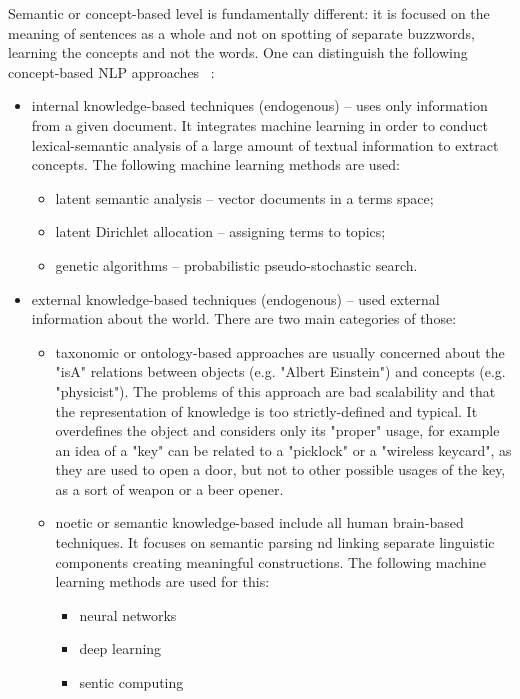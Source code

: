 \documentclass[11pt]{report}
\numberwithin{equation}{section} %
\begin{document}
Semantic or concept-based level is fundamentally different: it is focused on the meaning of sentences as a whole and not on spotting of separate buzzwords, learning the concepts and not the words. One can distinguish the following concept-based NLP approaches ~\cite{Cambria}:
\begin{itemize}
\item internal knowledge-based techniques (endogenous) -- uses only information from a given document. It integrates machine learning in order to conduct lexical-semantic analysis of a large amount of textual information to extract concepts. The following machine learning methods are used:  
\begin{itemize}
\item latent semantic analysis -- vector documents in a terms space;
\item latent Dirichlet allocation -- assigning terms to topics;
\item genetic algorithms -- probabilistic pseudo-stochastic search. 
\end{itemize}
\item external knowledge-based techniques (endogenous) -- used external information about the world. There are two main categories of those:
\begin{itemize}
\item taxonomic or ontology-based approaches are usually concerned about the "isA" relations between objects (e.g. "Albert Einstein") and concepts (e.g. "physicist"). The problems of this approach are bad scalability and that the representation of knowledge is too strictly-defined and typical. It overdefines the object and considers only its "proper" usage, for example an idea of a "key" can be related to a "picklock" or a "wireless keycard", as they are used to open a door, but not to other possible usages of the key, as a sort of weapon or a beer opener.
\item noetic or semantic knowledge-based include all human brain-based techniques. It focuses on semantic parsing nd linking separate linguistic components creating meaningful constructions. The following machine learning methods are used for this:
\begin{itemize}
\item neural networks
\item deep learning
\item sentic computing 
\end{itemize}
\end{itemize}
\end{itemize}
\end{document}
